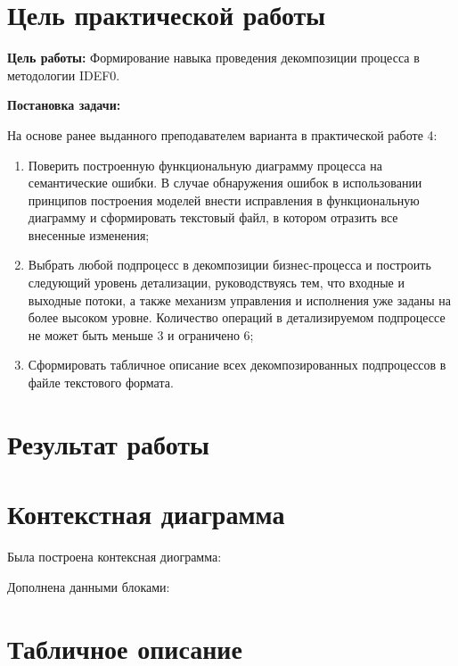 \section*{\LARGE Цель практической работы}

\textbf{Цель работы:} Формирование навыка проведения декомпозиции процесса в методологии IDEF0.


\textbf{Постановка задачи:}\par
На основе ранее выданного преподавателем варианта в практической работе 4:

\begin{enumerate}
	\item Поверить построенную функциональную диаграмму процесса на семантические ошибки.
	В случае обнаружения ошибок в использовании принципов построения моделей внести исправления в функциональную
	диаграмму и сформировать текстовый файл, в котором отразить все внесенные изменения;
	\item Выбрать любой подпроцесс в декомпозиции бизнес-процесса и построить следующий уровень детализации,
	руководствуясь тем, что входные и выходные потоки, а также механизм управления и исполнения уже заданы на более
	высоком уровне.
	Количество операций в детализируемом подпроцессе не может быть меньше 3 и ограничено 6;
	\item Сформировать табличное описание всех декомпозированных подпроцессов в файле текстового формата.
\end{enumerate}


\newpage

\section*{\LARGE Результат работы}

\section{Контекстная диаграмма}

Была построена контексная диограмма:

\newpage
{}

Дополнена данными блоками:

\section{Табличное описание}

